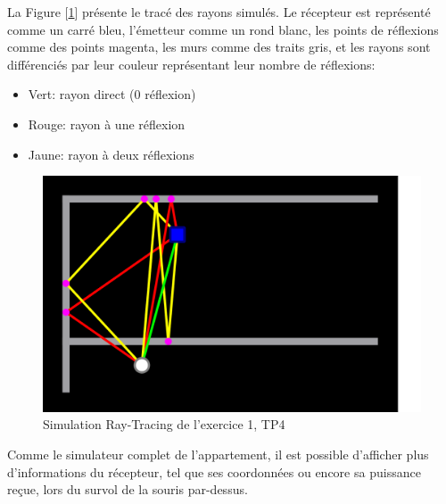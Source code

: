 La Figure [\ref{fig:simu-tp4}] présente le tracé des rayons simulés. Le récepteur est représenté comme un carré bleu, l'émetteur comme un rond blanc, les points de réflexions comme des points magenta, les murs comme des traits gris, et les rayons sont différenciés par leur couleur représentant leur nombre de réflexions:
\begin{itemize}
    \item Vert: rayon direct (0 réflexion)
    \item Rouge: rayon à une réflexion
    \item Jaune: rayon à deux réflexions
\end{itemize}

\begin{figure}[H]
    \centering
    \includegraphics[width=\textwidth]{latex/images/tp4.png}
    \caption{Simulation Ray-Tracing de l'exercice 1, TP4}
    \label{fig:simu-tp4}
\end{figure}

Comme le simulateur complet de l'appartement, il est possible d'afficher plus d'informations du récepteur, tel que ses coordonnées ou encore sa puissance reçue, lors du survol de la souris par-dessus.
